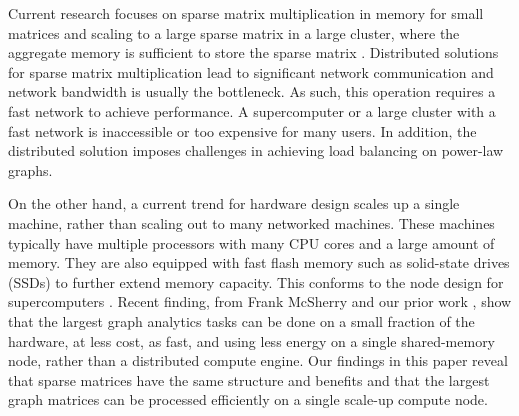 %




Current research focuses on sparse matrix multiplication in memory
for small matrices and scaling to a large sparse matrix in a large cluster,
where the aggregate memory is sufficient to store the sparse matrix
\cite{Williams07, Yoo11, Boman2013}.
Distributed solutions for sparse matrix multiplication lead to significant
network communication and network bandwidth is usually the bottleneck.
As such, this operation requires a fast network to achieve performance.
A supercomputer or a large cluster with a fast network is inaccessible or
too expensive for many users. In addition, the distributed solution imposes
challenges in achieving load balancing on power-law graphs.

On the other hand, a current trend for hardware design scales up
a single machine, rather than scaling out to
many networked machines.
These machines typically have multiple processors with many CPU cores and
a large amount of memory. They are also equipped with fast flash
memory such as solid-state drives (SSDs) to further extend memory capacity.
This conforms to the node design for supercomputers \cite{Ang14}.
Recent finding, from Frank McSherry \cite{McSherry15,McSherryBlog} and our
prior work \cite{FlashGraph},
show that the largest graph analytics tasks can be done on a small fraction of
the hardware, at less cost, as fast, and using less energy on a single shared-memory
node, rather than a distributed compute engine.  Our findings in this paper reveal
that sparse matrices have the same structure and benefits and that the largest graph
matrices can be processed efficiently on a single scale-up compute node.

